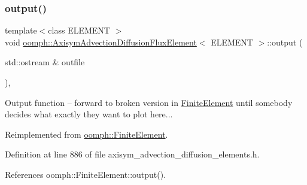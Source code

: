\mbox{\label{classoomph_1_1AxisymAdvectionDiffusionFluxElement_a5f97a254586d93abb151a25a4a148622}} 
\subsubsection{\texorpdfstring{output()}{output()}\hspace{0.1cm}{\footnotesize\ttfamily [1/2]}}
{\footnotesize\ttfamily template$<$class E\+L\+E\+M\+E\+NT $>$ \\
void \hyperlink{classoomph_1_1AxisymAdvectionDiffusionFluxElement}{oomph\+::\+Axisym\+Advection\+Diffusion\+Flux\+Element}$<$ E\+L\+E\+M\+E\+NT $>$\+::output (\begin{DoxyParamCaption}\item[{std\+::ostream \&}]{outfile }\end{DoxyParamCaption})\hspace{0.3cm}{\ttfamily [inline]}, {\ttfamily [virtual]}}



Output function -- forward to broken version in \hyperlink{classoomph_1_1FiniteElement}{Finite\+Element} until somebody decides what exactly they want to plot here... 



Reimplemented from \hyperlink{classoomph_1_1FiniteElement_a2ad98a3d2ef4999f1bef62c0ff13f2a7}{oomph\+::\+Finite\+Element}.



Definition at line 886 of file axisym\+\_\+advection\+\_\+diffusion\+\_\+elements.\+h.



References oomph\+::\+Finite\+Element\+::output().

\mbox{\label{classoomph_1_1AxisymAdvectionDiffusionFluxElement_ab2ba0c3df1b8ba82db067be66e83ce5b}} 
